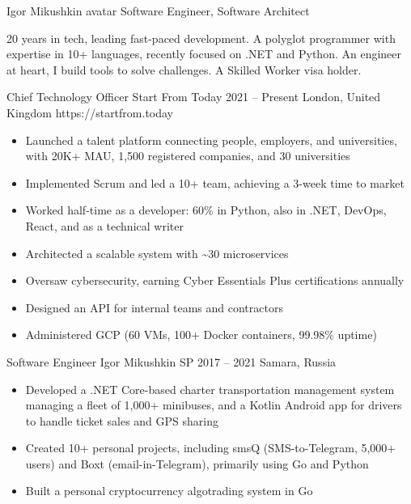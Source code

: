 \documentclass[9pt,a4paper]{juicv}
\begin{document}
\begin{paracol}{2}
\cvMakeHeader
    {Igor Mikushkin}
    {avatar}
    {Software Engineer, Software Architect}

    20 years in tech, leading fast-paced development.
    A polyglot programmer with expertise in 10+ languages, recently focused on .NET and Python.
    An engineer at heart, I build tools to solve challenges.
    A Skilled Worker visa holder.

    \cvLeftEvent
        {Chief Technology Officer}
        {Start From Today}
        {2021 -- Present}
        {London, United Kingdom}
        {https://startfrom.today}

        \begin{itemize}
            \item Launched a talent platform connecting people, employers, and universities,
                  with 20K+ MAU, 1,500 registered companies, and 30 universities
            \item Implemented Scrum and led a 10+ team,
                  achieving a 3-week time to market
            \item Worked half-time as a developer: 60\% in Python,
                  also in .NET, DevOps, React, and as a technical writer
            \item Architected a scalable system with \textasciitilde 30 microservices
            \item Oversaw cybersecurity, earning Cyber Essentials Plus certifications annually
            \item Designed an API for internal teams and contractors
            \item Administered GCP (60 VMs, 100+ Docker containers, 99.98\% uptime)
        \end{itemize}

    \cvLeftEvent
        {Software Engineer}
        {Igor Mikushkin SP}
        {2017 -- 2021}
        {Samara, Russia}
        {}

        \begin{itemize}
            \item Developed a .NET Core-based charter transportation management system
                  managing a fleet of 1,000+ minibuses,
                  and a Kotlin Android app for drivers to handle ticket sales and GPS sharing
            \item Created 10+ personal projects,
                  including smsQ (SMS-to-Telegram, 5,000+ users)
                  and Boxt (email-in-Telegram), primarily using Go and Python
            \item Built a personal cryptocurrency algotrading system in Go
        \end{itemize}


\end{paracol}
\end{document}
